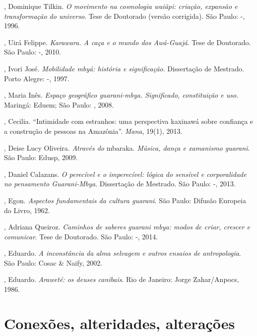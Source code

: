 \begin{Parskip}
, Dominique Tilkin. \emph{O movimento na cosmologia waiãpi:
criação, expansão e transformação do universo}. Tese de Doutorado
(versão corrigida). São Paulo: -, 1996.

, Uirá Felippe. \emph{Karawara. A caça e o mundo dos Awá-Guajá}.
Tese de Doutorado. São Paulo: -, 2010.

, Ivori José. \emph{Mobilidade mbyá: história e significação}.
Dissertação de Mestrado. Porto Alegre: -, 1997.

, Maria Inês. \emph{Espaço geográfico guarani-mbya. Significado,
constituição e uso}. Maringá: Eduem; São Paulo: , 2008.

, Cecilia. ``Intimidade com estranhos: uma perspectiva
kaxinawá sobre confiança e a construção de pessoas na Amazônia''. \emph{Mana},
19(1), 2013.

, Deise Lucy Oliveira. \emph{Através do} mbaraka. \emph{Música, dança e
xamanismo guarani}. São Paulo: Edusp, 2009.

, Daniel Calazans. \emph{O perecível e o imperecível: lógica do
sensível e corporalidade no pensamento Guarani-Mbya}. Dissertação de
Mestrado. São Paulo: -, 2013.

, Egon. \emph{Aspectos fundamentais da cultura guarani}. São
Paulo: Difusão Europeia do Livro, 1962.

, Adriana Queiroz. \emph{Caminhos de saberes guarani mbya: modos de
criar, crescer e comunicar}. Tese de Doutorado. São Paulo: -,
2014.

, Eduardo. \emph{A inconstância da alma selvagem e
outros ensaios de antropologia}. São Paulo: Cosac \& Naify, 2002.

, Eduardo. \emph{Araweté: os deuses canibais}. Rio de
Janeiro: Jorge Zahar/Anpocs, 1986.

\end{Parskip}

\part{Conexões, alteridades, alterações}
 
